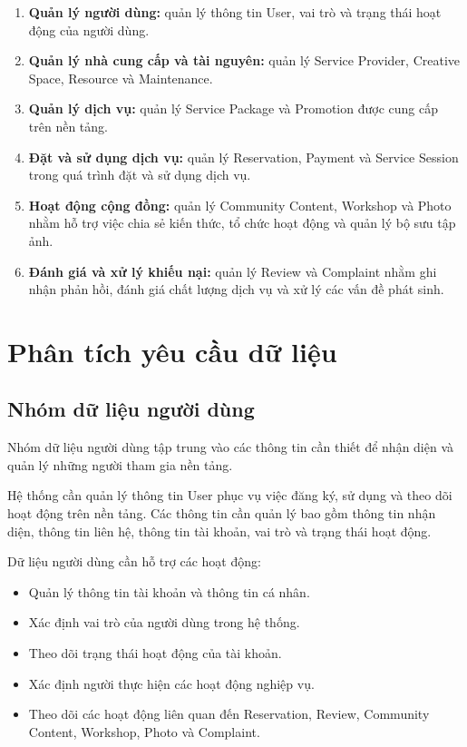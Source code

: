 \begin{enumerate}
	\item \textbf{Quản lý người dùng:} quản lý thông tin User, vai trò và trạng thái hoạt động của người dùng.
	
	\item \textbf{Quản lý nhà cung cấp và tài nguyên:} quản lý Service Provider, Creative Space, Resource và Maintenance.
	
	\item \textbf{Quản lý dịch vụ:} quản lý Service Package và Promotion được cung cấp trên nền tảng.
	
	\item \textbf{Đặt và sử dụng dịch vụ:} quản lý Reservation, Payment và Service Session trong quá trình đặt và sử dụng dịch vụ.
	
	\item \textbf{Hoạt động cộng đồng:} quản lý Community Content, Workshop và Photo nhằm hỗ trợ việc chia sẻ kiến thức, tổ chức hoạt động và quản lý bộ sưu tập ảnh.
	
	\item \textbf{Đánh giá và xử lý khiếu nại:} quản lý Review và Complaint nhằm ghi nhận phản hồi, đánh giá chất lượng dịch vụ và xử lý các vấn đề phát sinh.
\end{enumerate}

\section{Phân tích yêu cầu dữ liệu}

\subsection{Nhóm dữ liệu người dùng}

Nhóm dữ liệu người dùng tập trung vào các thông tin cần thiết để nhận diện và quản lý những người tham gia nền tảng.

Hệ thống cần quản lý thông tin User phục vụ việc đăng ký, sử dụng và theo dõi hoạt động trên nền tảng. Các thông tin cần quản lý bao gồm thông tin nhận diện, thông tin liên hệ, thông tin tài khoản, vai trò và trạng thái hoạt động.

Dữ liệu người dùng cần hỗ trợ các hoạt động:

\begin{itemize}
	\item Quản lý thông tin tài khoản và thông tin cá nhân.
	\item Xác định vai trò của người dùng trong hệ thống.
	\item Theo dõi trạng thái hoạt động của tài khoản.
	\item Xác định người thực hiện các hoạt động nghiệp vụ.
	\item Theo dõi các hoạt động liên quan đến Reservation, Review, Community Content, Workshop, Photo và Complaint.
\end{itemize}


